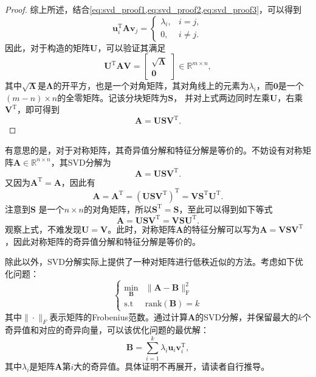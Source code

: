 \begin{proof}
    综上所述，结合\cref{eq:svd_proof1,eq:svd_proof2,eq:svd_proof3}，可以得到
    \[
        \bm{u}_i^{\mathrm{T}} \mathbf{A} \bm{v}_j =
        \begin{cases}
            \lambda_i, & i = j,    \\
            0,         & i \neq j.
        \end{cases}
    \]
    因此，对于构造的矩阵\( \mathbf{U} \)，可以验证其满足
    \[
        \mathbf{U}^{\mathrm{T}} \mathbf{A} \mathbf{V} =
        \begin{bmatrix}
            \sqrt{\mathbf{\Lambda}} \\
            \mathbf{0}
        \end{bmatrix} \in \mathbb{R}^{m \times n},
    \]
    其中\( \sqrt{\mathbf{\Lambda}} \)是\( \mathbf{\Lambda} \)的开平方，也是一个对角矩阵，其对角线上的元素为\( \lambda_i \)，而\( \mathbf{0} \)是一个\( (m - n) \times n \)的全零矩阵。记该分块矩阵为\( \mathbf{S} \)， 并对上式两边同时左乘\( \mathbf{U} \)，右乘\( \mathbf{V}^{\mathrm{T}} \)，即可得到
    \[
        \mathbf{A} = \mathbf{U} \mathbf{S} \mathbf{V}^{\mathrm{T}}.
    \]
\end{proof}

有意思的是，对于对称矩阵，其奇异值分解和特征分解是等价的。不妨设有对称矩阵\( \mathbf{A} \in \mathbb{R}^{n \times n} \)，其SVD分解为
\[
    \mathbf{A} = \mathbf{U} \mathbf{S} \mathbf{V}^{\mathrm{T}}.
\]
又因为\( \mathbf{A}^{\mathrm{T}} = \mathbf{A} \)，因此有
\[
    \mathbf{A} = \mathbf{A}^{\mathrm{T}}= \left( \mathbf{U} \mathbf{S} \mathbf{V}^{\mathrm{T}} \right)^{\mathrm{T}} = \mathbf{V} \mathbf{S}^{\mathrm{T}} \mathbf{U}^{\mathrm{T}}.
\]
注意到\( \mathbf{S} \) 是一个\( n \times n \)的对角矩阵，所以\( \mathbf{S}^{\mathrm{T}}  = \mathbf{S} \)，至此可以得到如下等式
\[
    \mathbf{A} = \mathbf{U} \mathbf{S} \mathbf{V}^{\mathrm{T}} = \mathbf{V} \mathbf{S} \mathbf{U}^{\mathrm{T}}.
\]
观察上式，不难发现\( \mathbf{U} =  \mathbf{V} \)。此时，对称矩阵\( \mathbf{A} \)的特征分解可以写为\( \mathbf{A} = \mathbf{V} \mathbf{S} \mathbf{V}^{\mathrm{T}} \)，因此对称矩阵的奇异值分解和特征分解是等价的。

除此以外，SVD分解实际上提供了一种对矩阵进行低秩近似的方法。考虑如下优化问题：
\begin{equation}
    \begin{cases}
        \min_{\mathbf{B}} & \|\mathbf{A} - \mathbf{B}\|_{\mathrm{F}}^2 \\
        \text{s.t}        & \text{rank}(\mathbf{B}) = k
    \end{cases}
    \label{eq:sparse-approximation}
\end{equation}
其中\( \|\cdot\|_F \)表示矩阵的Frobenius范数。通过计算\( \mathbf{A} \)的SVD分解，并保留最大的\( k \)个奇异值和对应的奇异向量，可以该优化问题的最优解：
\begin{equation}
    \mathbf{B} = \sum_{i=1}^{k} \lambda_i \bm{u}_i \bm{v}_i^{\mathrm{T}},
    \label{eq:sparse-approximation-solution}
\end{equation}
其中\( \lambda_i \)是矩阵\( \mathbf{A} \)第\( i \)大的奇异值。具体证明不再展开，请读者自行推导。

